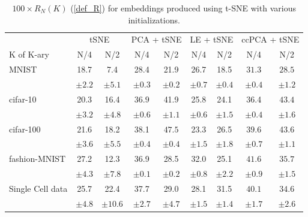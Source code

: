\begin{table}[H]
\caption{$100 \times R_{N}(K)$ (\ref{def_R}) for embeddings produced using t-SNE with various initializations.}
\begin{footnotesize}
\begin{center}
\begin{tabular}{lcccccccc}
\toprule
& \multicolumn{2}{c}{tSNE} & \multicolumn{2}{c}{PCA + tSNE} & \multicolumn{2}{c}{LE + tSNE} & \multicolumn{2}{c}{ccPCA + tSNE} \\
\cmidrule(lr){2-3}\cmidrule(lr){4-5}\cmidrule(lr){6-7}\cmidrule(lr){8-9}
K of K-ary & {N/4} & {N/2}  & {N/4} & {N/2} & {N/4} & {N/2} & {N/4} & {N/2} \\
\midrule
MNIST & 18.7 & 7.4 & 28.4 & 21.9 & 26.7 & 18.5 & $\bm{31.3}$ & $\bm{28.5}$ \\
& $\pm 2.2$ & $\pm 5.1$ & $\pm 0.3$ & $\pm 0.2$ & $\pm 0.7$ & $\pm 0.4$ & $\pm 0.4$ & $\pm 1.2$ 
\vspace{0.1cm}
\\
cifar-10 & 20.3 & 16.4 & $\bm{36.9}$ & 41.9 & 25.8 & 24.1 & 36.4 & $\bm{43.4}$ \\
& $\pm 3.2$ & $\pm 4.8$ & $\pm 0.6$ & $\pm 1.1$ & $\pm 0.6$ & $\pm 1.5$ & $\pm 0.4$ & $\pm 1.6$
\vspace{0.1cm}
\\
cifar-100 & 21.6 & 18.2 & 38.1 & $\bm{47.5}$ & 23.3 & 26.5 & $\bm{39.6}$ & 43.6 \\
& $\pm 3.6$ & $\pm 5.5$ & $\pm 0.4$ & $\pm 0.4$ & $\pm 1.5$ & $\pm 1.8$ & $\pm 0.7$ & $\pm 1.1$
\vspace{0.1cm}
\\
fashion-MNIST & 27.2 & 12.3 & 36.9 & 28.5 & 32.0 & 25.1 & $\bm{41.6}$ & $\bm{35.7}$ \\
& $\pm 4.3$ & $\pm 7.8$ & $\pm 0.1$ & $\pm 0.2$ & $\pm 0.8$ & $\pm 2.2$ & $\pm 0.9$ & $\pm 1.5$
\vspace{0.1cm}
\\
Single Cell data & 25.7 & 22.4 & 37.7 & 29.0 & 28.1 & 31.5 & $\bm{40.1}$ & $\bm{34.6}$ \\
& $\pm 4.8$ & $\pm 10.6$ & $\pm 2.7$ & $\pm 4.7$ & $\pm 1.5$ & $\pm 1.4$ & $\pm 1.7$ & $\pm 2.6$
\\
\bottomrule
\end{tabular}
\end{center}
\end{footnotesize}
\label{tSNE_quantitative_results}
\end{table}


